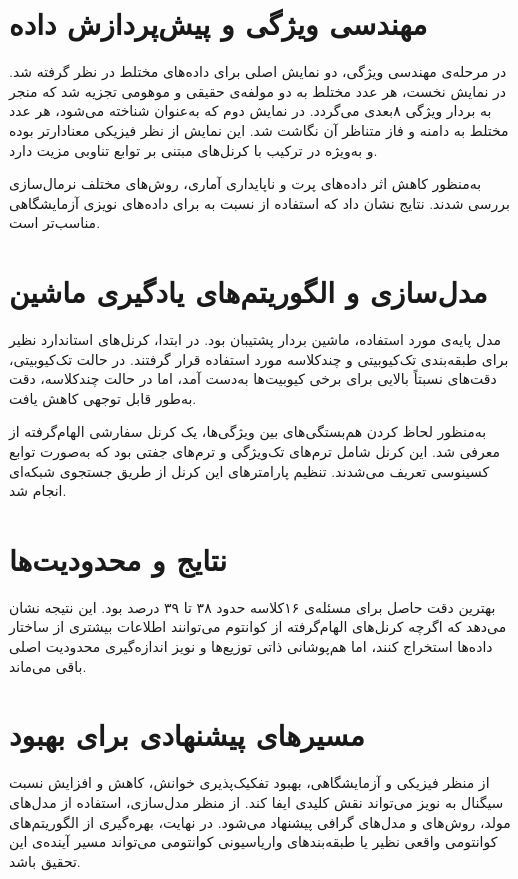 \section{مهندسی ویژگی و پیش‌پردازش داده}
در مرحله‌ی مهندسی ویژگی، دو نمایش اصلی برای داده‌های مختلط در نظر گرفته شد. در نمایش نخست، هر عدد مختلط به دو مولفه‌ی حقیقی و موهومی تجزیه شد که منجر به بردار ویژگی ۸بعدی می‌گردد. در نمایش دوم که به‌عنوان  شناخته می‌شود، هر عدد مختلط به دامنه و فاز متناظر آن نگاشت شد. این نمایش از نظر فیزیکی معنادارتر بوده و به‌ویژه در ترکیب با کرنل‌های مبتنی بر توابع تناوبی مزیت دارد.

به‌منظور کاهش اثر داده‌های پرت و ناپایداری آماری، روش‌های مختلف نرمال‌سازی بررسی شدند. نتایج نشان داد که استفاده از  نسبت به  برای داده‌های نویزی آزمایشگاهی مناسب‌تر است.

\section{مدل‌سازی و الگوریتم‌های یادگیری ماشین}
مدل پایه‌ی مورد استفاده، ماشین بردار پشتیبان  بود. در ابتدا، کرنل‌های استاندارد نظیر  برای طبقه‌بندی تک‌کیوبیتی و چندکلاسه مورد استفاده قرار گرفتند. در حالت تک‌کیوبیتی، دقت‌های نسبتاً بالایی برای برخی کیوبیت‌ها به‌دست آمد، اما در حالت چندکلاسه، دقت به‌طور قابل توجهی کاهش یافت.

به‌منظور لحاظ کردن هم‌بستگی‌های بین ویژگی‌ها، یک کرنل سفارشی الهام‌گرفته از  معرفی شد. این کرنل شامل ترم‌های تک‌ویژگی و ترم‌های جفتی بود که به‌صورت توابع کسینوسی تعریف می‌شدند. تنظیم پارامترهای این کرنل از طریق جستجوی شبکه‌ای انجام شد.

\section{نتایج و محدودیت‌ها}
بهترین دقت حاصل برای مسئله‌ی ۱۶کلاسه حدود ۳۸ تا ۳۹ درصد بود. این نتیجه نشان می‌دهد که اگرچه کرنل‌های الهام‌گرفته از کوانتوم می‌توانند اطلاعات بیشتری از ساختار داده‌ها استخراج کنند، اما هم‌پوشانی ذاتی توزیع‌ها و نویز اندازه‌گیری محدودیت اصلی باقی می‌ماند.

\section{مسیرهای پیشنهادی برای بهبود}
از منظر فیزیکی و آزمایشگاهی، بهبود تفکیک‌پذیری خوانش، کاهش  و افزایش نسبت سیگنال به نویز می‌تواند نقش کلیدی ایفا کند. از منظر مدل‌سازی، استفاده از مدل‌های مولد، روش‌های  و مدل‌های گرافی پیشنهاد می‌شود. در نهایت، بهره‌گیری از الگوریتم‌های کوانتومی واقعی نظیر  یا طبقه‌بندهای واریاسیونی کوانتومی می‌تواند مسیر آینده‌ی این تحقیق باشد.


